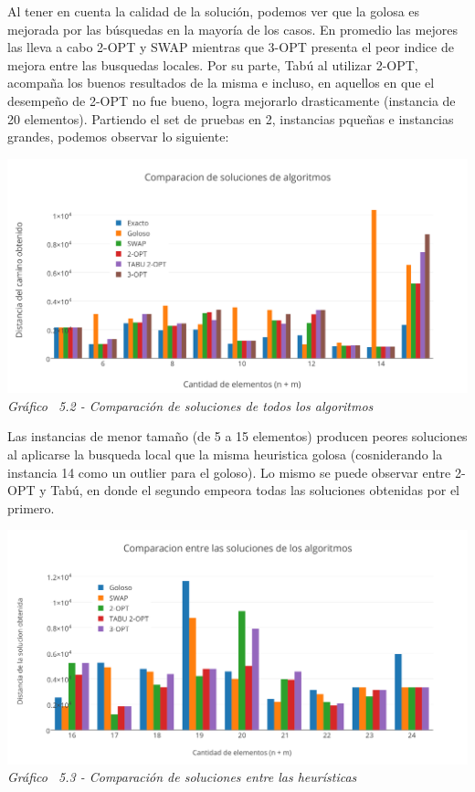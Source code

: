 Al tener en cuenta la calidad de la solución, podemos ver que la golosa es mejorada por las búsquedas en la mayoría de los casos. En promedio las mejores las lleva a cabo 2-OPT y SWAP mientras que 3-OPT presenta el peor indice de mejora entre las busquedas locales. Por su parte, Tabú al utilizar 2-OPT, acompaña los buenos resultados de la misma e incluso, en aquellos en que el desempeño de 2-OPT no fue bueno, logra mejorarlo drasticamente (instancia de 20 elementos).
Partiendo el set de pruebas en 2, instancias pqueñas e instancias grandes, podemos observar lo siguiente:

\vspace*{0.3cm} \vspace*{0.3cm}
  \begin{center}
 \includegraphics[scale=0.5]{./EJ5/comparativo2.png}\\
 {\textit{Gráfico \ 5.2 - Comparaci\'on de soluciones de todos los algoritmos}}
  \end{center}
  \vspace*{0.3cm}


Las instancias de menor tamaño (de 5 a 15 elementos) producen peores soluciones al aplicarse la busqueda local que la misma heuristica golosa (cosniderando la instancia 14 como un outlier para el goloso). Lo mismo se puede observar entre 2-OPT y Tabú, en donde el segundo empeora todas las soluciones obtenidas por el primero.


\vspace*{0.3cm} \vspace*{0.3cm}
  \begin{center}
 \includegraphics[scale=0.5]{./EJ5/comparativo1.png}\\
 {\textit{Gráfico \ 5.3 - Comparaci\'on de soluciones entre las heur\'isticas}}
  \end{center}
  \vspace*{0.3cm}

